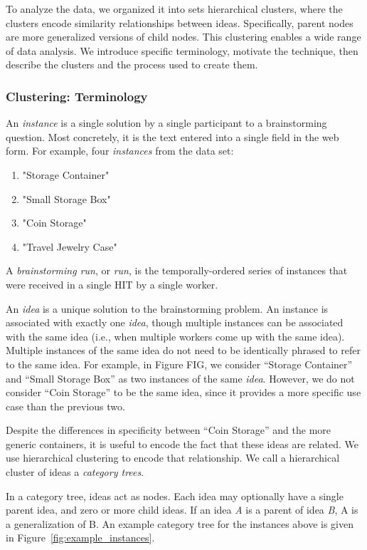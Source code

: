 To analyze the data, we organized it into sets hierarchical clusters, where the clusters encode similarity relationships between ideas. Specifically, parent nodes are more generalized versions of child nodes. This clustering enables a wide range of data analysis. We introduce specific terminology, motivate the technique, then describe the clusters and the process used to create them.

\subsubsection{Clustering: Terminology}
An \emph{instance} is a single solution by a single participant to a brainstorming question. Most concretely, it is the text entered into a single field in the web form. For example, four \emph{instances} from the data set:

\begin{enumerate}
    \item "Storage Container"
    \item "Small Storage Box"
    \item "Coin Storage"
    \item "Travel Jewelry Case"
\end{enumerate}

A \emph{brainstorming run}, or \emph{run}, is the temporally-ordered series of instances that were received in a single HIT by a single worker.

An \emph{idea} is a unique solution to the brainstorming problem. An instance is associated with exactly one \emph{idea}, though multiple instances can be associated with the same idea (i.e., when multiple workers come up with the same idea). Multiple instances of the same idea do not need to be identically phrased to refer to the same idea. For example, in Figure FIG, we consider ``Storage Container'' and ``Small Storage Box'' as two instances of the same \emph{idea}. However, we do not consider ``Coin Storage'' to be the same idea, since it provides a more specific use case than the previous two.

Despite the differences in specificity between ``Coin Storage'' and the more generic containers, it is useful to encode the fact that these ideas are related. We use hierarchical clustering to encode that relationship. We call a hierarchical cluster of ideas a \emph{category trees}.

In a category tree, ideas act as nodes. Each idea may optionally have a single parent idea, and zero or more child ideas. If an idea \emph{A} is a parent of idea \emph{B}, A is a generalization of B. An example category tree for the instances above is given in Figure~\ref{fig:example_instances}.

